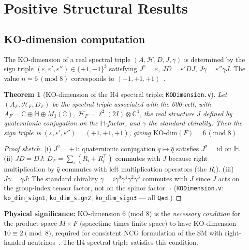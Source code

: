 \documentclass[12pt,a4paper]{article}
\newtheorem{theorem}{Theorem}[section]
\newcommand{\HF}{\mathcal{H}_F}
\newcommand{\AF}{A_F}
\newcommand{\DF}{D_F}
\newcommand{\TwoI}{2I}
\newcommand{\Qed}{\texttt{Qed}}
\begin{document}
\section{Positive Structural Results}
\label{sec:positive}

\subsection{KO-dimension computation}
\label{sec:kodim}

The KO-dimension of a real spectral triple \((A, \mathcal{H}, D, J, \gamma)\) is determined
by the sign triple \((\varepsilon, \varepsilon', \varepsilon'') \in \{+1,-1\}^3\) satisfying
\(J^2 = \varepsilon\), \(JD = \varepsilon' DJ\), \(J\gamma = \varepsilon''\gamma J\).
The value \(n = 6\,(\mathrm{mod}\;8)\) corresponds to \((+1, +1, +1)\)~\cite{Chamseddine:2007oz}.

\begin{theorem}[KO-dimension of the H4 spectral triple; \texttt{KODimension.v}]
\label{thm:kodim}
Let \((\AF, \HF, \DF)\) be the spectral triple associated with the 600-cell,
with \(\AF = \mathbb{C} \oplus \mathbb{H} \oplus M_3(\mathbb{C})\),
\(\HF = \ell^2(\TwoI) \otimes \mathbb{C}^4\), the real structure \(J\) defined by
quaternionic conjugation on the \(\mathbb{H}\)-factor, and \(\gamma\) the standard
chirality. Then the sign triple is \((\varepsilon, \varepsilon', \varepsilon'') = (+1,+1,+1)\),
giving \(\mathrm{KO}\text{-}\mathrm{dim}(F) = 6\,(\mathrm{mod}\;8)\).
\end{theorem}

\begin{proof}[Proof sketch]
(i) \(J^2 = +1\): quaternionic conjugation \(q \mapsto \bar q\) satisfies
\(J^2 = \mathrm{id}\) on \(\mathbb{H}\).
(ii) \(JD = DJ\): \(\DF = \sum_i (R_i + R_i^\top)\) commutes with \(J\) because
right multiplication by \(\bar q\) commutes with left multiplication operators (the
\(R_i\)).
(iii) \(J\gamma = \gamma J\): The standard chirality \(\gamma = i\gamma^0\gamma^1\gamma^2\gamma^3\)
commutes with \(J\) since \(J\) acts on the group-index tensor factor, not on the spinor factor.
\(\square\) (\texttt{KODimension.v}: \texttt{ko\_dim\_sign1}, \texttt{ko\_dim\_sign2},
\texttt{ko\_dim\_sign3} --- all \(\Qed\).)
\end{proof}

\textbf{Physical significance:} KO-dimension 6 (mod 8) is the \emph{necessary condition}
for the product space \(M \times F\) (spacetime times finite space) to have KO-dimension
\(10 \equiv 2\pmod{8}\), required for consistent NCG formulation of the SM with right-handed
neutrinos~\cite{Chamseddine:2007oz}. The H4 spectral triple satisfies this condition.
\end{document}
